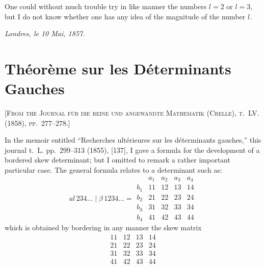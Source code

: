 \documentclass[11pt,a4paper]{book}
\begin{document}
One could without much trouble try in like manner the numbers $l=2$ or $l=3$, but I do not know whether one has any idea of the magnitude of the number $l$.

\medskip
\noindent\textit{Londres, le 10 Mai, 1857.}

\newpage


\section{Théorème sur les Déterminants Gauches}

\textsc{[From the Journal für die reine und angewandte Mathematik (Crelle), t.~LV. (1858), pp.~277--278.]}
\label{paper:237}

\setcounter{page}{73}

In the memoir entitled ``Recherches ultérieures sur les déterminants gauches,'' this journal t.~L. pp.~299--313 (1855), [137], I gave a formula for the development of a bordered skew determinant; but I omitted to remark a rather important particular case. The general formula relates to a determinant such as:
\[
\renewcommand{\arraystretch}{1.2}
a\!\!\textit{l}\,234\ldots \mid \beta\,1234\ldots =
\begin{array}{c|cccc}
& a_1 & a_2 & a_3 & a_4 \\
\hline
b_1 & 11 & 12 & 13 & 14 \\
b_2 & 21 & 22 & 23 & 24 \\
b_3 & 31 & 32 & 33 & 34 \\
b_4 & 41 & 42 & 43 & 44
\end{array}
\]
which is obtained by bordering in any manner the skew matrix
\[
\begin{array}{cccc}
11 & 12 & 13 & 14 \\
21 & 22 & 23 & 24 \\
31 & 32 & 33 & 34 \\
41 & 42 & 43 & 44
\end{array}
\]

\setcounter{page}{74}
\end{document}

